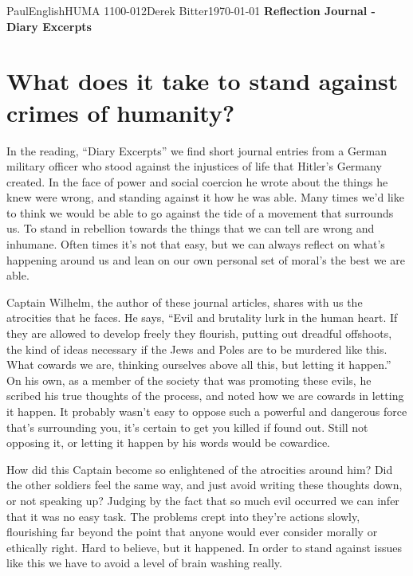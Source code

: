 \documentclass[12pt,letterpaper]{article}
\begin{document}
\begin{mla}{Paul}{English}{HUMA 1100-012}{Derek
    Bitter}{\today}    
    {\textbf{Reflection Journal - Diary Excerpts}}

\section*{What does it take to stand against crimes of humanity?}

In the reading, ``Diary Excerpts'' we find short journal entries from a German military officer who stood against the injustices of life that Hitler's Germany created. In the face of power and social coercion he wrote about the things he knew were wrong, and standing against it how he was able. Many times we'd like to think we would be able to go against the tide of a movement that surrounds us. To stand in rebellion towards the things that we can tell are wrong and inhumane. Often times it's not that easy, but we can always reflect on what's happening around us and lean on our own personal set of moral's the best we are able.

Captain Wilhelm, the author of these journal articles, shares with us the atrocities that he faces. He says, ``Evil and brutality lurk in the human heart. If they are allowed to develop freely they flourish, putting out dreadful offshoots, the kind of ideas necessary if the Jews and Poles are to be murdered like this. What cowards we are, thinking ourselves above all this, but letting it happen.'' On his own, as a member of the society that was promoting these evils, he scribed his true thoughts of the process, and noted how we are cowards in letting it happen. It probably wasn't easy to oppose such a powerful and dangerous force that's surrounding you, it's certain to get you killed if found out. Still not opposing it, or letting it happen by his words would be cowardice.

How did this Captain become so enlightened of the atrocities around him? Did the other soldiers feel the same way, and just avoid writing these thoughts down, or not speaking up? Judging by the fact that so much evil occurred we can infer that it was no easy task. The problems crept into they're actions slowly, flourishing far beyond the point that anyone would ever consider morally or ethically right. Hard to believe, but it happened. In order to stand against issues like this we have to avoid a level of brain washing really.


\end{mla}
\end{document}
